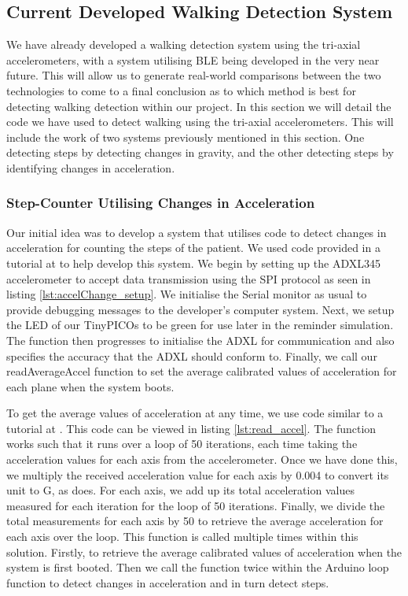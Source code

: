 {\subsection{Current Developed Walking Detection System}

We have already developed a walking detection system using the tri-axial accelerometers, with a system utilising BLE being developed in the very near future. This will allow us to generate real-world comparisons between the two technologies to come to a final conclusion as to which method is best for detecting walking detection within our project. In this section we will detail the code we have used to detect walking using the tri-axial accelerometers. This will include the work of two systems previously mentioned in this section. One detecting steps by detecting changes in gravity, and the other detecting steps by identifying changes in acceleration.

\subsubsection{Step-Counter Utilising Changes in Acceleration}

Our initial idea was to develop a system that utilises code to detect changes in acceleration for counting the steps of the patient. We used code provided in a tutorial at \cite{agnihotri_2021} to help develop this system. We begin by setting up the ADXL345 accelerometer to accept data transmission using the SPI protocol as seen in listing \ref{lst:accelChange_setup}. We initialise the Serial monitor as usual to provide debugging messages to the developer's computer system. Next, we setup the LED of our TinyPICOs to be green for use later in the reminder simulation. The function then progresses to initialise the ADXL for communication and also specifies the accuracy that the ADXL should conform to. Finally, we call our readAverageAccel function to set the average calibrated values of acceleration for each plane when the system boots.



To get the average values of acceleration at any time, we use code similar to a tutorial at \cite{agnihotri_2021}. This code can be viewed in listing \ref{lst:read_accel}. The function works such that it runs over a loop of 50 iterations, each time taking the acceleration values for each axis from the accelerometer. Once we have done this, we multiply the received acceleration value for each axis by 0.004 to convert its unit to G, as \cite{agnihotri_2021} does. For each axis, we add up its total acceleration values measured for each iteration for the loop of 50 iterations. Finally, we divide the total measurements for each axis by 50 to retrieve the average acceleration for each axis over the loop. This function is called multiple times within this solution. Firstly, to retrieve the average calibrated values of acceleration when the system is first booted. Then we call the function twice within the Arduino loop function to detect changes in acceleration and in turn detect steps.

}
